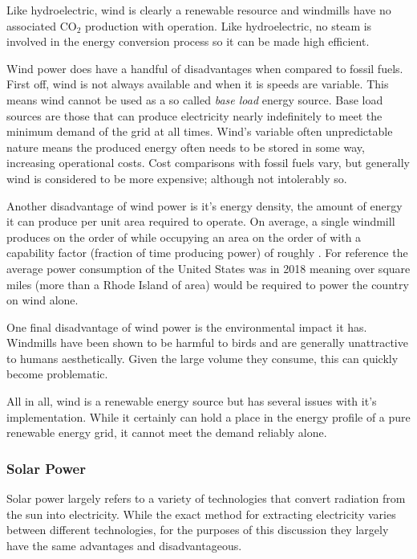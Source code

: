		Like hydroelectric, wind is clearly a renewable resource and windmills have no associated CO$_2$ production with operation. \cite{bibid} Like hydroelectric, no steam is involved in the energy conversion process so it can be made high efficient. \cite{bibid}
		
		Wind power does have a handful of disadvantages when compared to fossil fuels. First off, wind is not always available and when it is speeds are variable. This means wind cannot be used as a so called \emph{base load} energy source.\cite{bibid} Base load sources are those that can produce electricity nearly indefinitely to meet the minimum demand of the grid at all times. \cite{bibid} Wind's variable often unpredictable nature means the produced energy often needs to be stored in some way, increasing operational costs. \cite{bibid} Cost comparisons with fossil fuels vary, but generally wind is considered to be more expensive; although not intolerably so. \cite{bibid}
		
		Another disadvantage of wind power is it's energy density, the amount of energy it can produce per unit area required to operate. On average, a single windmill produces on the order of  while occupying an area on the order of  with a capability factor (fraction of time producing power) of roughly . \cite{bibid} For reference the average power consumption of the United States was  in 2018 \cite{bibid} meaning over  square miles (more than a Rhode Island of area) would be required to power the country on wind alone. 
		
		One final disadvantage of wind power is the environmental impact it has. Windmills have been shown to be harmful to birds \cite{bibid} and are generally unattractive to humans aesthetically. \cite{bibid} Given the large volume they consume, this can quickly become problematic. 
		
		All in all, wind is a renewable energy source but has several issues with it's implementation. While it certainly can hold a place in the energy profile of a pure renewable energy grid, it cannot meet the demand reliably alone.
		
	
	\subsubsection{Solar Power}
	
		Solar power largely refers to a variety of technologies that convert radiation from the sun into electricity. \cite{bibid} While the exact method for extracting electricity varies between different technologies, for the purposes of this discussion they largely have the same advantages and disadvantageous.
		
